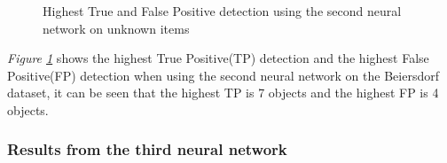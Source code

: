 \begin{figure}[h]
    \centering
    \hfill
    
    \caption{Highest True and False Positive detection using the second neural network on unknown items}
    \label{fig:v2max}
\end{figure}

\textit{Figure \ref{fig:v2max}} shows the highest True Positive(TP) detection and the highest False Positive(FP) detection when using the second neural network on the Beiersdorf dataset, it can be seen that the highest TP is 7 objects and the highest FP is 4 objects.

\clearpage
\subsubsection{Results from the third neural network}
